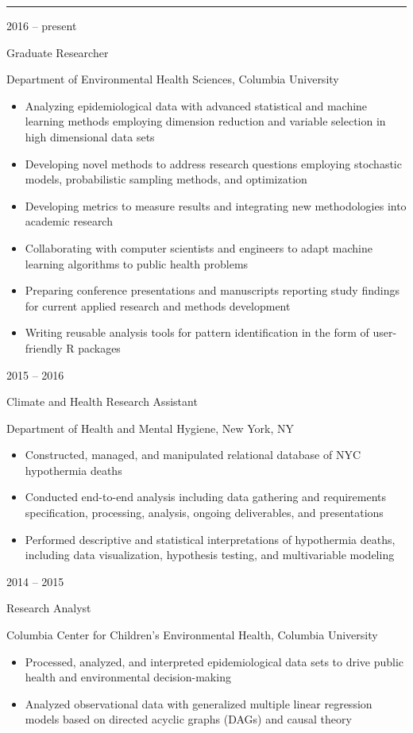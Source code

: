 \documentclass[a4paper,10pt]{article}
\newlength{\cvcolumngapwidth}
\newlength{\cvleftcolumnwidth}
\newlength{\cvrightcolumnwidth}
\newcommand{\cvsectionstyle}[1]{{\normalsize\cvsectionfont\textcolor{cvsectioncolor}{#1}}}
\newcommand{\cvtitlestyle}[1]{{\large\cvtitlefont\textcolor{cvtitlecolor}{#1}}}
\newcommand{\cvdurationstyle}[1]{{\small\cvdurationfont\textcolor{cvdurationcolor}{#1}}}
\newlength{\cvafteritemskipamount}
\newlength{\cvaftersectionskipamount}
\newlength{\cvaftertitleskipamount}
\newlength{\cvparskip}
\newcommand{\cvsection}[1]{
    \begin{minipage}[t]{\cvleftcolumnwidth}
        \raggedleft\cvsectionstyle{#1}
    \end{minipage}%
    \hspace{\cvcolumngapwidth}%
    \begin{minipage}[t]{\cvrightcolumnwidth}
        \textcolor{cvrulecolor}{\rule{\cvrightcolumnwidth}{0.3mm}}
    \end{minipage}

    \vspace{\cvaftersectionskipamount}
}
\newcommand{\cvitem}[2]{
    \begin{minipage}[t]{\cvleftcolumnwidth}
        \raggedleft #1
    \end{minipage}%
    \hspace{\cvcolumngapwidth}%
    \begin{minipage}[t]{\cvrightcolumnwidth}
        \setlength{\parskip}{\cvparskip} #2
    \end{minipage}

    \vspace{\cvafteritemskipamount}
}
\newcommand{\cvtitle}[1]{
    \cvtitlestyle{#1}

    \vspace{\cvaftertitleskipamount}
    \vspace{-\cvparskip}
}
\begin{document}
\cvsection{WORK EXPERIENCE}

\cvitem{
    \cvdurationstyle{2016 -- present}
}{
    \cvtitle{Graduate Researcher}

    Department of Environmental Health Sciences, Columbia University

    \begin{itemize}[leftmargin=*]
            \item Analyzing epidemiological data with advanced statistical and machine learning methods employing dimension reduction and variable selection in high dimensional data sets
        \item Developing novel methods to address research questions employing stochastic models, probabilistic sampling methods, and optimization
        \item Developing metrics to measure results and integrating new methodologies into academic research
        \item Collaborating with computer scientists and engineers to adapt machine learning algorithms to public health problems
         \item Preparing conference presentations and manuscripts reporting study findings for current applied research and methods development
        \item Writing reusable analysis tools for pattern identification in the form of user-friendly R packages
    \end{itemize}
}

\cvitem{
    \cvdurationstyle{2015 -- 2016}
}{
    \cvtitle{Climate and Health Research Assistant}

    Department of Health and Mental Hygiene, New York, NY

    \begin{itemize}[leftmargin=*]
            \item Constructed, managed, and manipulated relational database of NYC hypothermia deaths
        \item Conducted end-to-end analysis including data gathering and requirements specification, processing, analysis, ongoing deliverables, and presentations
        \item Performed descriptive and statistical interpretations of hypothermia deaths, including data visualization, hypothesis testing, and multivariable modeling
    \end{itemize}
}

\cvitem{
    \cvdurationstyle{2014 -- 2015}
}{
    \cvtitle{Research Analyst}

    Columbia Center for Children's Environmental Health, Columbia University

    \begin{itemize}[leftmargin=*]
            \item Processed, analyzed, and interpreted epidemiological data sets to drive public health and environmental decision-making
        \item Analyzed observational data with generalized multiple linear regression models based on directed acyclic graphs (DAGs) and causal theory
    \end{itemize}
}
\end{document}
